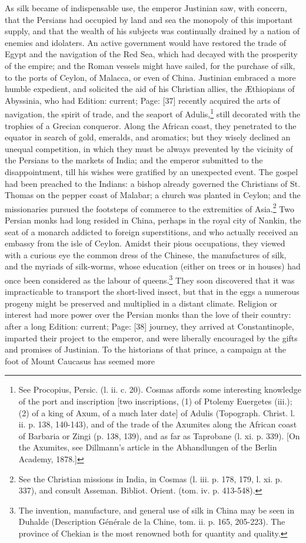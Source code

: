As silk became of indispensable use, the emperor Justinian saw, with concern, that the Persians had occupied by land and sea the monopoly of this important supply, and that the wealth of his subjects was continually drained by a nation of enemies and idolaters. An active government would have restored the trade of Egypt and the navigation of the Red Sea, which had decayed with the prosperity of the empire; and the Roman vessels might have sailed, for the purchase of silk, to the ports of Ceylon, of Malacca, or even of China. Justinian embraced a more humble expedient, and solicited the aid of his Christian allies, the Æthiopians of Abyssinia, who had Edition: current; Page: [37] recently acquired the arts of navigation, the spirit of trade, and the seaport of Adulis,\footnote{See Procopius, Persic. (l. ii. c. 20). Cosmas affords some interesting knowledge of the port and inscription [two inscriptions, (1) of Ptolemy Euergetes (iii.); (2) of a king of Axum, of a much later date] of Adulis (Topograph. Christ. l. ii. p. 138, 140-143), and of the trade of the Axumites along the African coast of Barbaria or Zingi (p. 138, 139), and as far as Taprobane (l. xi. p. 339). [On the Axumites, see Dillmann\texthebrew{}’s article in the Abhandlungen of the Berlin Academy, 1878.]} still decorated with the trophies of a Grecian conqueror. Along the African coast, they penetrated to the equator in search of gold, emeralds, and aromatics; but they wisely declined an unequal competition, in which they must be always prevented by the vicinity of the Persians to the markets of India; and the emperor submitted to the disappointment, till his wishes were gratified by an unexpected event. The gospel had been preached to the Indians: a bishop already governed the Christians of St. Thomas on the pepper coast of Malabar; a church was planted in Ceylon; and the missionaries pursued the footsteps of commerce to the extremities of Asia.\footnote{See the Christian missions in India, in Cosmas (l. iii. p. 178, 179, l. xi. p. 337), and consult Asseman. Bibliot. Orient. (tom. iv. p. 413-548).} Two Persian monks had long resided in China, perhaps in the royal city of Nankin, the seat of a monarch addicted to foreign superstitions, and who actually received an embassy from the isle of Ceylon. Amidst their pious occupations, they viewed with a curious eye the common dress of the Chinese, the manufactures of silk, and the myriads of silk-worms, whose education (either on trees or in houses) had once been considered as the labour of queens.\footnote{The invention, manufacture, and general use of silk in China may be seen in Duhalde (Description Générale de la Chine, tom. ii. p. 165, 205-223). The province of Chekian is the most renowned both for quantity and quality.} They soon discovered that it was impracticable to transport the short-lived insect, but that in the eggs a numerous progeny might be preserved and multiplied in a distant climate. Religion or interest had more power over the Persian monks than the love of their country: after a long Edition: current; Page: [38] journey, they arrived at Constantinople, imparted their project to the emperor, and were liberally encouraged by the gifts and promises of Justinian. To the historians of that prince, a campaign at the foot of Mount Caucasus has seemed more 